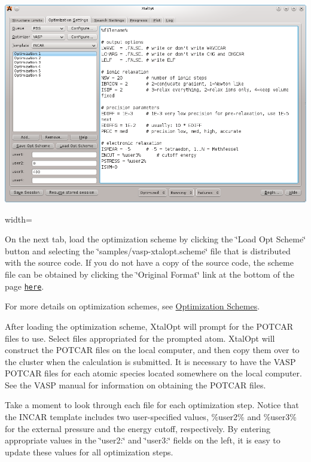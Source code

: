 \begin{DoxyImage}
\includegraphics{opt-set-vasp.png}
\caption{width=}
\end{DoxyImage}


On the next tab, load the optimization scheme by clicking the \char`\"{}\-Load
\-Opt Scheme\char`\"{} button and selecting the \char`\"{}samples/vasp-\/xtalopt.\-scheme\char`\"{} file that is distributed with the source code. If you do not have a copy of the source code, the scheme file can be obtained by clicking the \char`\"{}\-Original Format\char`\"{} link at the bottom of the page \href{http://xtalopt.openmolecules.net/wiki/index.fcgi/browser/samples/vasp-xtalopt.scheme}{\tt here}.

For more details on optimization schemes, see \hyperlink{optschemes}{Optimization Schemes}.

After loading the optimization scheme, Xtal\-Opt will prompt for the P\-O\-T\-C\-A\-R files to use. Select files appropriated for the prompted atom. Xtal\-Opt will construct the P\-O\-T\-C\-A\-R files on the local computer, and then copy them over to the cluster when the calculation is submitted. It is necessary to have the V\-A\-S\-P P\-O\-T\-C\-A\-R files for each atomic species located somewhere on the local computer. See the V\-A\-S\-P manual for information on obtaining the P\-O\-T\-C\-A\-R files.

Take a moment to look through each file for each optimization step. Notice that the I\-N\-C\-A\-R template includes two user-\/specified values, \%user2\% and \%user3\% for the external pressure and the energy cutoff, respectively. By entering appropriate values in the \char`\"{}user2\-:\char`\"{} and \char`\"{}user3\-:\char`\"{} fields on the left, it is easy to update these values for all optimization steps.


